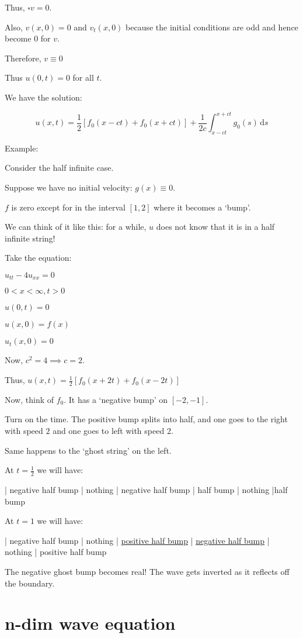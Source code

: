 \documentclass{article}
\theoremstyle{definition}
\begin{document}
Thus, \(\square v = 0\).

Also, \(v(x,0)=0\) and \(v_t(x,0)\) because the initial conditions are odd and hence become \(0\) for \(v\).

Therefore, \(v\equiv 0\) 

Thus \(u(0,t)=0\) for all \(t\).

We have the solution:

\[
    u(x,t) = \frac{1}{2}\left[ f_0(x-ct) + f_0(x+ct) \right] + \frac{1}{2c} \int_{x-ct}^{x+ct} g_0(s) \,\mathrm{d}s 
\]

Example:

Consider the half infinite case.

Suppose we have no initial velocity: \(g(x)\equiv 0\).

\(f\) is zero except for in the interval \([1,2]\) where it becomes a `bump'.

We can think of it like this: for a while, \(u\) does not know that it is in a half infinite string!

Take the equation:

\(u_{t t} - 4 u_{x x} = 0\) 

\(0 < x < \infty , t > 0\) 

\(u(0,t) = 0\) 

\(u(x,0) = f(x)\) 

\(u_t(x,0) = 0\) 

Now, \(c^2 = 4 \implies c = 2\).

Thus, \(u(x,t) = \frac{1}{2} \left[ f_0(x+2t) + f_0(x-2t) \right]  \) 

Now, think of \(f_0\). It has a `negative bump' on \([-2,-1]\).

Turn on the time. The positive bump splits into half, and one goes to the right with speed \(2\) and one goes to left with speed 2.

Same happens to the `ghost string' on the left.

At \(t = \frac{1}{2}\) we will have:

| negative half bump | nothing | negative half bump | half bump | nothing |half bump

At \(t = 1\) we will have:

| negative half bump | nothing | \underline{positive half bump} | \underline{negative half bump} | nothing | positive half bump

The negative ghost bump becomes real!  The wave gets inverted as it reflects off the boundary.

\section*{n-dim wave equation}
\end{document}
